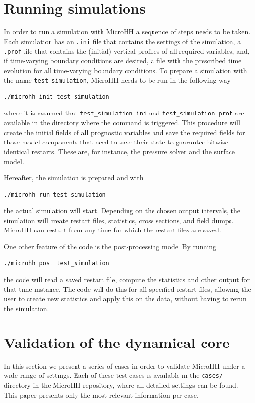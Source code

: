 \documentclass[gmd]{copernicus}
\begin{document}
\section{Running simulations}
\label{sec:running_simulations}
In order to run a simulation with MicroHH a sequence of steps needs to be taken. Each simulation has an \texttt{.ini} file that contains the settings of the simulation, a \texttt{.prof} file that contains the (initial) vertical profiles of all required variables, and, if time-varying boundary conditions are desired, a file with the prescribed time evolution for all time-varying boundary conditions. To prepare a simulation with the name \texttt{test\_simulation}, MicroHH needs to be run in the following way
\begin{verbatim}
./microhh init test_simulation
\end{verbatim}
where it is assumed that \texttt{test\_simulation.ini} and \texttt{test\_simulation.prof} are available in the directory where the command is triggered. This procedure will create the initial fields of all prognostic variables and save the required fields for those model components that need to save their state to guarantee bitwise identical restarts. These are, for instance, the pressure solver and the surface model.

Hereafter, the simulation is prepared and with
\begin{verbatim}
./microhh run test_simulation
\end{verbatim}
the actual simulation will start. Depending on the chosen output intervals, the simulation will create restart files, statistics, cross sections, and field dumps. MicroHH can restart from any time for which the restart files are saved.

One other feature of the code is the post-processing mode. By running 
\begin{verbatim}
./microhh post test_simulation
\end{verbatim}
the code will read a saved restart file, compute the statistics and other output for that time instance. The code will do this for all specified restart files, allowing the user to create new statistics and apply this on the data, without having to rerun the simulation.

 \section{Validation of the dynamical core} \label{sec:tests}
In this section we present a series of cases in order to validate MicroHH under a wide range of settings. Each of these test cases is available in the \texttt{cases/} directory in the MicroHH repository, where all detailed settings can be found. This paper presents only the most relevant information per case.
\end{document}
